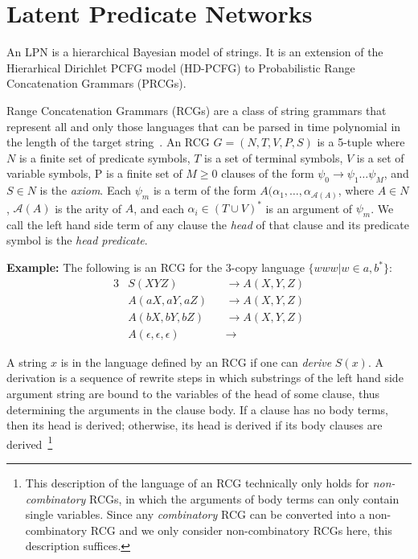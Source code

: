 \documentclass[11pt, twocolumn]{article}
\begin{document}
\section{Latent Predicate Networks}

An LPN is a hierarchical Bayesian model of strings. It is an
extension of the Hierarhical Dirichlet PCFG model (HD-PCFG) to
Probabilistic Range Concatenation Grammars (PRCGs). 

Range Concatenation Grammars (RCGs) are a class of string grammars
that represent all and only those languages that can be parsed in time
polynomial in the length of the target
string~\cite{boullier2005range}. An RCG $G=(N, T, V, P, S)$ is a
5-tuple where $N$ is a finite set of predicate symbols, $T$ is a set
of terminal symbols, $V$ is a set of variable symbols, P is a finite
set of $M \geq 0$ clauses of the form $\psi_0 \rightarrow \psi_1 \dots
\psi_M$, and $S \in N$ is the \emph{axiom}. Each $\psi_m$ is a term of
the form $A(\alpha_1, \dots, \alpha_{\mathcal{A}(A)}$, where $A \in
N$, $\mathcal{A}(A)$ is the arity of $A$, and each $\alpha_i \in (T
\cup V)^*$ is an argument of $\psi_m$. We call the left hand side term
of any clause the \emph{head} of that clause and its predicate symbol
is the \emph{head predicate}.

\textbf{Example:} The following is an RCG for the 3-copy language
$\{www | w \in {a, b}^*\}$:
\begin{alignat*}{3}
&S(XYZ) &&\rightarrow A(X, Y, Z)\\
&A(aX, aY, aZ) &&\rightarrow A(X, Y, Z)\\
&A(bX, bY, bZ) &&\rightarrow A(X, Y, Z)\\
&A(\epsilon, \epsilon, \epsilon) &&\rightarrow 
\end{alignat*}


A string $x$ is in the language defined by an RCG if one can
\emph{derive} $S(x)$. A derivation is a sequence of rewrite steps in
which substrings of the left hand side argument string are bound to
the variables of the head of some clause, thus determining the
arguments in the clause body. If a clause has no body terms, then its
head is derived; otherwise, its head is derived if its body clauses
are derived~\footnote{This description of the language of an RCG
  technically only holds for \emph{non-combinatory} RCGs, in which the
  arguments of body terms can only contain single variables. Since any
  \emph{combinatory} RCG can be converted into a non-combinatory RCG
  and we only consider non-combinatory RCGs here, this description
  suffices.}
\end{document}

